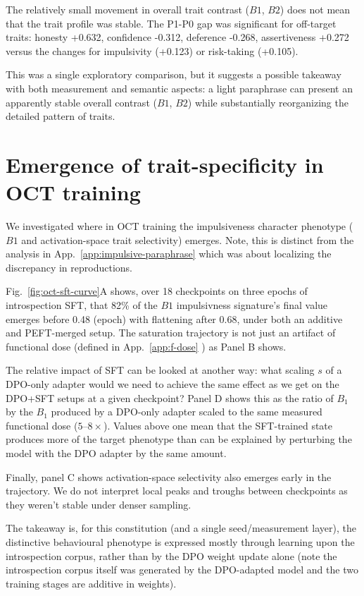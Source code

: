 \documentclass[11pt]{article}
\begin{document}
The relatively small movement in overall trait contrast ($B1$, $B2$) does not mean that the trait profile was stable. The P1-P0 gap was significant for off-target traits: honesty +0.632, confidence -0.312, deference -0.268, assertiveness +0.272 versus the changes for impulsivity (+0.123) or risk-taking (+0.105).

This was a single exploratory comparison, but it suggests a possible takeaway with both measurement and semantic aspects: a light paraphrase can present an apparently stable overall contrast ($B1$, $B2$) while substantially reorganizing the detailed pattern of traits.


\section{Emergence of trait-specificity in OCT training}
\label{sec:oct-stage}

We investigated where in OCT training the impulsiveness character phenotype ($B1$ and activation-space trait selectivity) emerges. Note, this is distinct from the analysis in App.~\ref{app:impulsive-paraphrase} which was about localizing the discrepancy in reproductions. 

Fig.~\ref{fig:oct-sft-curve}A shows, over 18 checkpoints on three epochs of introspection SFT, that 82\% of the $B1$ impulsivness signature's final value emerges before 0.48 (epoch) with flattening after 0.68, under both an additive and PEFT-merged setup. The saturation trajectory is not just an artifact of functional dose (defined in App.~\ref{app:f-dose}
) as Panel B shows. 

The relative impact of SFT can be looked at another way: what scaling $s$ of a DPO-only adapter would we need to achieve the same effect as we get on the DPO+SFT setups at a given checkpoint? Panel D shows this as the ratio of $B_1$ by the $B_1$ produced by a DPO-only adapter scaled to the same measured functional dose ($5$--$8\times$). Values above one mean that the SFT-trained state produces more of the target phenotype than can be explained by perturbing the model with the DPO adapter by the same amount.

Finally, panel C shows activation-space selectivity also emerges early in the trajectory. We do not interpret local peaks and troughs between checkpoints as they weren't stable under denser sampling. 

The takeaway is, for this constitution (and a single seed/measurement layer), the distinctive behavioural phenotype is expressed mostly through learning upon the introspection corpus, rather than by the DPO weight update alone (note the introspection corpus itself was generated by the DPO-adapted model and the two training stages are additive in weights).
\end{document}
